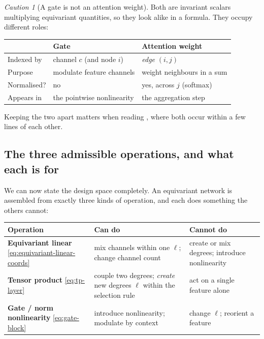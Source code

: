 \documentclass[11pt,a4paper]{report}
\theoremstyle{definition}
\theoremstyle{remark}
\newtheorem{caution}[caution]{Caution}
\begin{document}
\begin{caution}[A gate is not an attention weight]
\label{caution:gate-vs-attention}
Both are invariant scalars multiplying equivariant quantities, so they look
alike in a formula. They occupy different roles:
\begin{center}
\begin{tabular}{lll}
\toprule
& Gate & Attention weight \\
\midrule
Indexed by & channel $c$ (and node $i$) & \emph{edge} $(i,j)$ \\
Purpose & modulate feature channels & weight neighbours in a sum \\
Normalised? & no & yes, across $j$ (softmax) \\
Appears in & the pointwise nonlinearity & the aggregation step \\
\bottomrule
\end{tabular}
\end{center}
Keeping the two apart matters when reading ,
where both occur within a few lines of each other.
\end{caution}

\subsection{The three admissible operations, and what each is for}
\label{sec:three-operations}

We can now state the design space completely. An equivariant network is
assembled from exactly three kinds of operation, and each does something the
others cannot:

\begin{center}
\begin{tabular}{p{3.1cm}p{4.4cm}p{4.4cm}}
\toprule
Operation & Can do & Cannot do \\
\midrule
\textbf{Equivariant linear} \eqref{eq:equivariant-linear-coords} & mix channels within one $\ell$; change channel count & create or mix degrees; introduce nonlinearity \\[3pt]
\textbf{Tensor product} \eqref{eq:tp-layer} & couple two degrees; \emph{create} new degrees $\ell$ within the selection rule & act on a single feature alone \\[3pt]
\textbf{Gate / norm nonlinearity} \eqref{eq:gate-block} & introduce nonlinearity; modulate by context & change $\ell$; reorient a feature \\
\bottomrule
\end{tabular}
\end{center}
\end{document}
